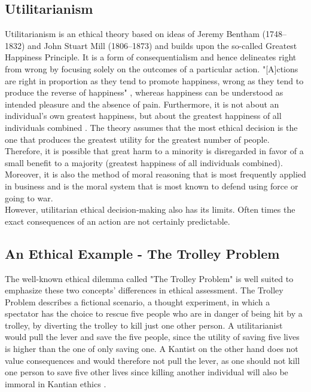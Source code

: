 \documentclass[10pt,twocolumn,twoside]{osajnl}
\begin{document}
\subsection{Utilitarianism}
Utilitarianism is an ethical theory based on ideas of Jeremy Bentham (1748--1832) and John Stuart Mill (1806--1873) and builds upon the so-called Greatest Happiness Principle. %
It is a form of consequentialism and hence delineates right from wrong by focusing solely on the outcomes of a particular action. 
"[A]ctions are right in proportion as they tend to promote happiness, wrong as they tend to produce the reverse of happiness" \cite{utilitarianism}, whereas happiness can be understood as intended pleasure and the absence of pain.
Furthermore, it is not about an individual's own greatest happiness, but about the greatest happiness of all individuals combined \cite{utilitarianism}. 
The theory assumes that the most ethical decision is the one that produces the greatest utility for the greatest number of people.
Therefore, it is possible that great harm to a minority is disregarded in favor of a small benefit to a majority (greatest happiness of all individuals combined).
\\
Moreover, it is also the method of moral reasoning that is most frequently applied in business \cite{EthicsUnwrapped} and is the moral system that is most known to defend using force or going to war. \\
However, utilitarian ethical decision-making also has its limits. Often times the exact consequences of an action are not certainly predictable.


\subsection{An Ethical Example - The Trolley Problem} %
The well-known ethical dilemma called "The Trolley Problem" is well suited to emphasize these two concepts' differences in ethical assessment. 
The Trolley Problem describes a fictional scenario, a thought experiment, in which a spectator has the choice to rescue five people who are in danger of being hit by a trolley, by diverting the trolley to kill just one other person. 
A utilitarianist would pull the lever and save the five people, since the utility of saving five lives is higher than the one of only saving one. A Kantist on the other hand
does not value consequences and would therefore not pull the lever, as one should not kill one person to save five other lives since killing another individual will also be immoral in Kantian ethics \cite{}. 
\end{document}
